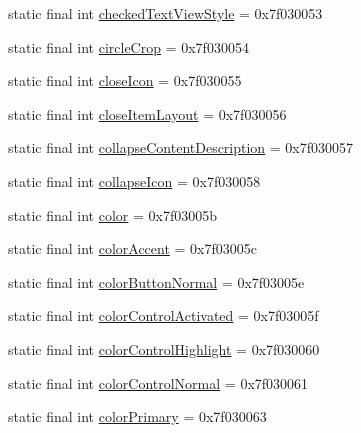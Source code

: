 \begin{DoxyCompactItemize}
\item 
static final int \mbox{\hyperlink{classcom_1_1google_1_1android_1_1gms_1_1R_1_1attr_a28fe8f9fa54f6f74e9eecba3847d3fcb}{checked\+Text\+View\+Style}} = 0x7f030053
\item 
static final int \mbox{\hyperlink{classcom_1_1google_1_1android_1_1gms_1_1R_1_1attr_aefaee65e036c09541714768d45ee14b4}{circle\+Crop}} = 0x7f030054
\item 
static final int \mbox{\hyperlink{classcom_1_1google_1_1android_1_1gms_1_1R_1_1attr_a72329fdd9f8dc8646ec2171b70ededb3}{close\+Icon}} = 0x7f030055
\item 
static final int \mbox{\hyperlink{classcom_1_1google_1_1android_1_1gms_1_1R_1_1attr_a0122b0cee73dde14a712432ba2fac49a}{close\+Item\+Layout}} = 0x7f030056
\item 
static final int \mbox{\hyperlink{classcom_1_1google_1_1android_1_1gms_1_1R_1_1attr_a11392d3ead871de23bb31f28a2676008}{collapse\+Content\+Description}} = 0x7f030057
\item 
static final int \mbox{\hyperlink{classcom_1_1google_1_1android_1_1gms_1_1R_1_1attr_ad1a1f8a3d919dcbf4058fc6e0bab1b24}{collapse\+Icon}} = 0x7f030058
\item 
static final int \mbox{\hyperlink{classcom_1_1google_1_1android_1_1gms_1_1R_1_1attr_ad8d3ec4e7c3fedb40258bb3f4ab384eb}{color}} = 0x7f03005b
\item 
static final int \mbox{\hyperlink{classcom_1_1google_1_1android_1_1gms_1_1R_1_1attr_a5d2dd9bb808f570f775acac8ee3336ff}{color\+Accent}} = 0x7f03005c
\item 
static final int \mbox{\hyperlink{classcom_1_1google_1_1android_1_1gms_1_1R_1_1attr_aa1b2fadd6f13579b91150756a74edf49}{color\+Button\+Normal}} = 0x7f03005e
\item 
static final int \mbox{\hyperlink{classcom_1_1google_1_1android_1_1gms_1_1R_1_1attr_aa12e06e65b6d81e391835670368df9ba}{color\+Control\+Activated}} = 0x7f03005f
\item 
static final int \mbox{\hyperlink{classcom_1_1google_1_1android_1_1gms_1_1R_1_1attr_a9598b3ef2a7960b7941454ed04373dc6}{color\+Control\+Highlight}} = 0x7f030060
\item 
static final int \mbox{\hyperlink{classcom_1_1google_1_1android_1_1gms_1_1R_1_1attr_a2bc7534f397271026777011324d06cc1}{color\+Control\+Normal}} = 0x7f030061
\item 
static final int \mbox{\hyperlink{classcom_1_1google_1_1android_1_1gms_1_1R_1_1attr_a1835eeb16933ea82de255e05cbfbb391}{color\+Primary}} = 0x7f030063

\end{DoxyCompactItemize}
